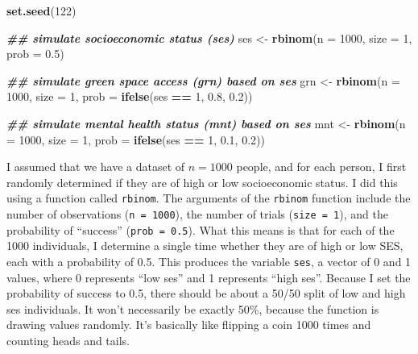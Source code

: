 \documentclass[
]{book}
\newenvironment{Shaded}{\begin{snugshade}}{\end{snugshade}}
\newcommand{\AttributeTok}[1]{\textcolor[rgb]{0.13,0.29,0.53}{#1}}
\newcommand{\DecValTok}[1]{\textcolor[rgb]{0.00,0.00,0.81}{#1}}
\newcommand{\DocumentationTok}[1]{\textcolor[rgb]{0.56,0.35,0.01}{\textbf{\textit{#1}}}}
\newcommand{\FloatTok}[1]{\textcolor[rgb]{0.00,0.00,0.81}{#1}}
\newcommand{\FunctionTok}[1]{\textcolor[rgb]{0.13,0.29,0.53}{\textbf{#1}}}
\newcommand{\NormalTok}[1]{#1}
\newcommand{\OtherTok}[1]{\textcolor[rgb]{0.56,0.35,0.01}{#1}}
\newcommand{\SpecialCharTok}[1]{\textcolor[rgb]{0.81,0.36,0.00}{\textbf{#1}}}
\begin{document}
\begin{Shaded}
\begin{Highlighting}[]
\FunctionTok{set.seed}\NormalTok{(}\DecValTok{122}\NormalTok{)}

\DocumentationTok{\#\# simulate socioeconomic status (ses)}
\NormalTok{ses }\OtherTok{\textless{}{-}} \FunctionTok{rbinom}\NormalTok{(}\AttributeTok{n =} \DecValTok{1000}\NormalTok{, }\AttributeTok{size =} \DecValTok{1}\NormalTok{, }\AttributeTok{prob =} \FloatTok{0.5}\NormalTok{)}

\DocumentationTok{\#\# simulate green space access (grn) based on ses}
\NormalTok{grn }\OtherTok{\textless{}{-}} \FunctionTok{rbinom}\NormalTok{(}\AttributeTok{n =} \DecValTok{1000}\NormalTok{, }\AttributeTok{size =} \DecValTok{1}\NormalTok{, }\AttributeTok{prob =} \FunctionTok{ifelse}\NormalTok{(ses }\SpecialCharTok{==} \DecValTok{1}\NormalTok{, }\FloatTok{0.8}\NormalTok{, }\FloatTok{0.2}\NormalTok{))}

\DocumentationTok{\#\# simulate mental health status (mnt) based on ses}
\NormalTok{mnt }\OtherTok{\textless{}{-}} \FunctionTok{rbinom}\NormalTok{(}\AttributeTok{n =} \DecValTok{1000}\NormalTok{, }\AttributeTok{size =} \DecValTok{1}\NormalTok{, }\AttributeTok{prob =} \FunctionTok{ifelse}\NormalTok{(ses }\SpecialCharTok{==} \DecValTok{1}\NormalTok{, }\FloatTok{0.1}\NormalTok{, }\FloatTok{0.2}\NormalTok{))}
\end{Highlighting}
\end{Shaded}

I assumed that we have a dataset of \(n = 1000\) people, and for each person, I first randomly determined if they are of high or low socioeconomic status. I did this using a function called \texttt{rbinom}. The arguments of the \texttt{rbinom} function include the number of observations (\texttt{n\ =\ 1000}), the number of trials (\texttt{size\ =\ 1}), and the probability of ``success'' (\texttt{prob\ =\ 0.5}). What this means is that for each of the 1000 individuals, I determine a single time whether they are of high or low SES, each with a probability of 0.5. This produces the variable \texttt{ses}, a vector of 0 and 1 values, where 0 represents ``low ses'' and 1 represents ``high ses''. Because I set the probability of success to 0.5, there should be about a 50/50 split of low and high ses individuals. It won't necessarily be exactly 50\%, because the function is drawing values randomly. It's basically like flipping a coin 1000 times and counting heads and tails.
\end{document}
